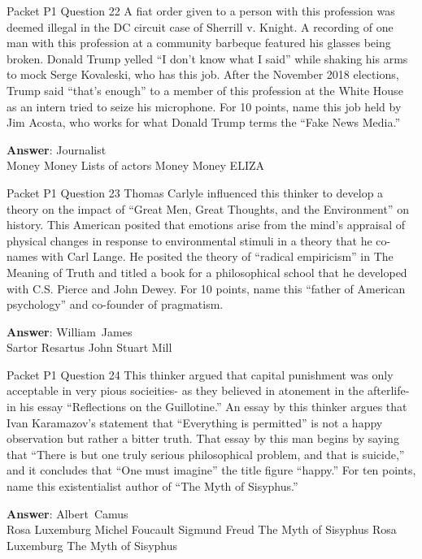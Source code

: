 \begin{frame}{Packet P1 Question 22}
A fiat order given to     a person with this profession was deemed illegal in the DC circuit case of Sherrill v. Knight. A recording of one man with this profession at a community barbeque featured his glasses being broken. Donald Trump yelled ``I don't know what I said'' while shaking his arms to mock Serge Kovaleski, who has this job. After the November 2018 elections, Trump said ``that's enough'' to a member of this profession at the White House as an intern tried to seize his microphone. For 10 points, name this job held by Jim Acosta, who works for what Donald Trump terms the ``Fake News Media.''        

\textbf{Answer}: Journalist\\
 Money
 Money
 Lists of actors
 Money
 Money
 ELIZA
\end{frame}

\begin{frame}{Packet P1 Question 23}
Thomas Carlyle influenced   this thinker to develop a theory on the impact of ``Great Men, Great Thoughts, and the Environment''   on history. This American posited that emotions arise from   the mind's appraisal of physical changes in response to environmental stimuli in a theory that he   co-names with Carl Lange. He posited the theory of ``radical empiricism'' in The Meaning   of Truth and titled a book for a philosophical school that he developed with C.S. Pierce and John Dewey. For 10 points, name this ``father of American psychology'' and co-founder   of pragmatism.

\textbf{Answer}: William\ James\\
 Sartor Resartus
 John Stuart Mill
\end{frame}

\begin{frame}{Packet P1 Question 24}
This thinker argued that   capital punishment   was only acceptable in very pious socieities- as they believed in atonement in the afterlife- in his essay ``Reflections   on the Guillotine.'' An essay by this thinker argues that Ivan   Karamazov's statement that ``Everything is permitted'' is not a happy observation but rather a bitter   truth. That essay by this man begins by saying that ``There is but one truly serious philosophical problem, and that is suicide,'' and it concludes that ``One must imagine'' the title   figure ``happy.'' For ten points, name this existentialist author of ``The Myth of Sisyphus.''    

\textbf{Answer}: Albert\ Camus\\
 Rosa Luxemburg
 Michel Foucault
 Sigmund Freud
 The Myth of Sisyphus
 Rosa Luxemburg
 The Myth of Sisyphus
\end{frame}

